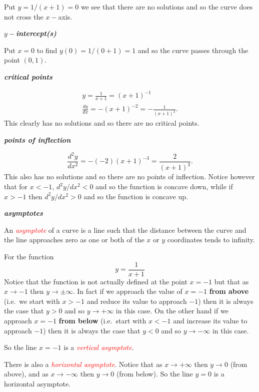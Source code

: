 \documentclass[
  11pt,
  oneside]{book}
\newcommand{\slide}{}
\theoremstyle{definition}
\theoremstyle{definition}
\theoremstyle{definition}
\theoremstyle{definition}
\theoremstyle{remark}
\begin{document}
Put \(y=1/(x+1) = 0\) we see that there are no solutions and so the curve does not cross the \(x-\)axis.

\textbf{\emph{\(y-\)intercept(s)}}

Put \(x=0\) to find \(y(0) = 1/(0+1) = 1\) and so the curve passes through the point \((0,1)\).

\slide

\textbf{\emph{critical points}}

\begin{gather*}
y=\frac1{x+1} = (x+1)^{-1}\\
\frac{dy}{dx} = -(x+1)^{-2} = -\frac1{(x+1)^2}.
\end{gather*}
This clearly has no solutions and so there are no critical points.

\textbf{\emph{points of inflection}}

\[
\frac{d^2y}{dx^2} = -(-2)(x+1)^{-3} = \frac2{(x+1)^3}.
\]
This also has no solutions and so there are no points of inflection. Notice however that for \(x < -1\), \(d^2y/dx^2<0\) and so the function is concave down, while if \(x>-1\) then \(d^2y/dx^2 >0\) and so the function is concave up.

\slide

\textbf{\emph{asymptotes}}

An \textcolor{red}{\em asymptote} of a curve is a line such that the distance between the curve and the line approaches zero as one or both of the \(x\) or \(y\) coordinates tends to infinity.

For the function
\[
y=\frac1{x+1}
\]
Notice that the function is not actually defined at the point \(x=-1\) but that as \(x\to-1\) then \(y\to\pm\infty\). In fact if we approach the value of \(x=-1\) \textbf{from above} (i.e.~we start with \(x > -1\) and reduce its value to approach \(-1\)) then it is always the case that \(y>0\) and so \(y\to+\infty\) in this case. On the other hand if we approach \(x=-1\) \textbf{from below} (i.e.~start with \(x<-1\) and increase its value to approach \(-1\)) then it is always the case that \(y<0\) and so \(y\to-\infty\) in this case.

So the line \(x=-1\) is a \textcolor{red}{\em vertical asymptote}.

There is also a \textcolor{red}{\em horizontal asymptote}. Notice that as \(x\to+\infty\) then \(y\to 0\) (from above), and as \(x\to-\infty\) then \(y\to0\) (from below). So the line \(y=0\) is a horizontal asymptote.
\end{document}
